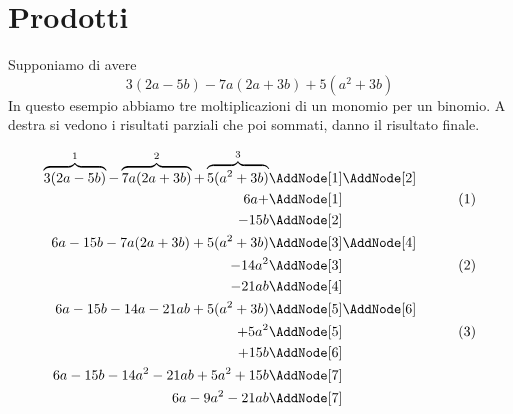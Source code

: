 \section{Prodotti}
\begin{esempio}
Supponiamo di avere \[3(2a-5b)-7a(2a+3b)+5(a^2+3b)\]
In questo esempio abbiamo tre moltiplicazioni di un monomio per un binomio. A destra si vedono i risultati parziali  che poi sommati, danno il risultato finale.
\begin{NodesList}
	\begin{align*}
		\overbrace{3(2a-5b)}^{1}-\overbrace{7a(2a+3b)}^{2}+\overbrace{5(a^2+3b)}^{3}&\AddNode[1]\AddNode[2]\\
		6a+&\AddNode[1]&\tag{1}\\ 
		-15b&\AddNode[2]&\\
		6a-15b-7a(2a+3b)+5(a^2+3b)&\AddNode[3]\AddNode[4]\\
		-14a^2&\AddNode[3]&\tag{2}\\    
		-21ab&\AddNode[4]&\\
		6a-15b-14a-21ab+5(a^2+3b)&\nonumber\AddNode[5]\AddNode[6]\\
		+5a^2&\AddNode[5]&\tag{3}\\
		+15b&\AddNode[6]&\\
		6a-15b-14a^2-21ab+5a^2+15b&\nonumber\AddNode[7]&\\   
		6a-9a^2-21ab&\nonumber\AddNode[7] 
	\end{align*}
\end{NodesList}
\end{esempio}
